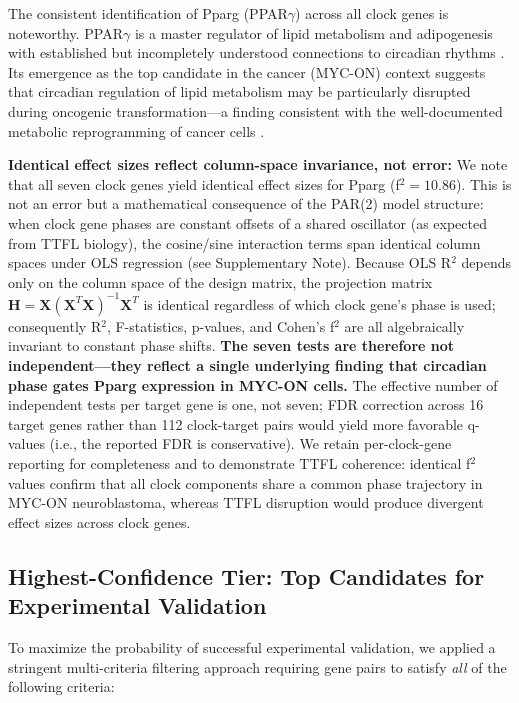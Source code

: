 \documentclass[11pt,a4paper]{article}
\begin{document}
The consistent identification of Pparg (PPAR$\gamma$) across all clock genes is noteworthy. PPAR$\gamma$ is a master regulator of lipid metabolism and adipogenesis with established but incompletely understood connections to circadian rhythms \citep{wang2008regulation, yang2006nuclear}. Its emergence as the top candidate in the cancer (MYC-ON) context suggests that circadian regulation of lipid metabolism may be particularly disrupted during oncogenic transformation---a finding consistent with the well-documented metabolic reprogramming of cancer cells \citep{hanahan2011hallmarks, pavlova2016emerging}.

\textbf{Identical effect sizes reflect column-space invariance, not error:} We note that all seven clock genes yield identical effect sizes for Pparg (f$^2 = 10.86$). This is not an error but a mathematical consequence of the PAR(2) model structure: when clock gene phases are constant offsets of a shared oscillator (as expected from TTFL biology), the cosine/sine interaction terms span identical column spaces under OLS regression (see Supplementary Note). Because OLS R$^2$ depends only on the column space of the design matrix, the projection matrix $\mathbf{H} = \mathbf{X}(\mathbf{X}^T\mathbf{X})^{-1}\mathbf{X}^T$ is identical regardless of which clock gene's phase is used; consequently R$^2$, F-statistics, p-values, and Cohen's f$^2$ are all algebraically invariant to constant phase shifts. \textbf{The seven tests are therefore not independent---they reflect a single underlying finding that circadian phase gates Pparg expression in MYC-ON cells.} The effective number of independent tests per target gene is one, not seven; FDR correction across 16 target genes rather than 112 clock-target pairs would yield more favorable q-values (i.e., the reported FDR is conservative). We retain per-clock-gene reporting for completeness and to demonstrate TTFL coherence: identical f$^2$ values confirm that all clock components share a common phase trajectory in MYC-ON neuroblastoma, whereas TTFL disruption would produce divergent effect sizes across clock genes.

\subsection{Highest-Confidence Tier: Top Candidates for Experimental Validation}

To maximize the probability of successful experimental validation, we applied a stringent multi-criteria filtering approach requiring gene pairs to satisfy \textit{all} of the following criteria:
\end{document}
